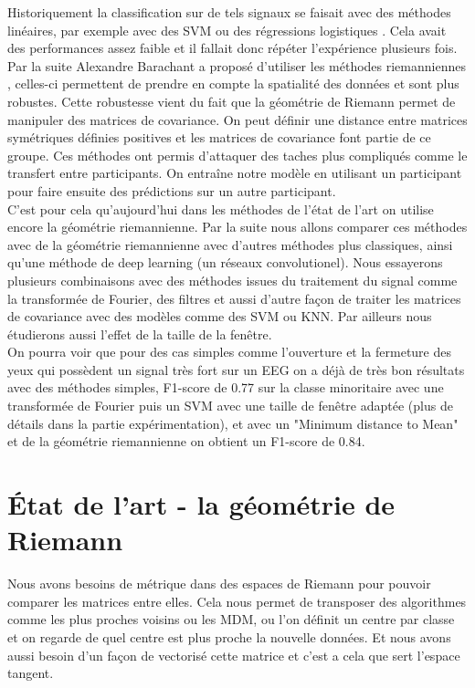 \documentclass{article}[12pt]
\begin{document}
Historiquement la classification sur de tels signaux se faisait avec des méthodes linéaires, par exemple avec des SVM ou des régressions logistiques \cite{garcia_support_2003}. Cela avait des performances assez faible et il fallait donc répéter l’expérience plusieurs fois. Par la suite Alexandre Barachant a proposé d'utiliser les méthodes riemanniennes \cite{congedo_riemannian_2017}, celles-ci permettent de prendre en compte la spatialité des données et sont plus robustes. Cette robustesse vient du fait que la géométrie de Riemann permet de manipuler des matrices de covariance. On peut définir une distance entre matrices symétriques définies positives et les matrices de covariance font partie de ce groupe. Ces méthodes ont permis d'attaquer des taches plus compliqués comme le transfert entre participants. On entraîne notre modèle en utilisant un participant pour faire ensuite des prédictions sur un autre participant.\\

C'est pour cela qu'aujourd'hui dans les méthodes de l’état de l'art on utilise encore la géométrie riemannienne. Par la suite nous allons comparer ces méthodes avec de la géométrie riemannienne avec d'autres méthodes plus classiques, ainsi qu'une méthode de deep learning (un réseaux convolutionel). Nous essayerons plusieurs combinaisons avec des méthodes issues du traitement du signal comme la transformée de Fourier, des filtres et aussi d'autre façon de traiter les matrices de covariance avec des modèles comme des SVM ou KNN. Par ailleurs nous étudierons aussi l'effet de la taille de la fenêtre.\\

On pourra voir que pour des cas simples comme l'ouverture et la fermeture des yeux qui possèdent un signal très fort sur un EEG on a déjà de très bon résultats avec des méthodes simples, F1-score de 0.77 sur la classe minoritaire avec une transformée de Fourier puis un SVM avec une taille de fenêtre adaptée (plus de détails dans la partie expérimentation), et avec un "Minimum distance to Mean" et de la géométrie riemannienne on obtient un F1-score de 0.84.\\

\part{État de l'art - la géométrie de Riemann}
Nous avons besoins de métrique dans des espaces de Riemann pour pouvoir comparer les matrices entre elles. Cela nous permet de transposer des algorithmes comme les plus proches voisins ou les MDM, ou l'on définit un centre par classe et on regarde de quel centre est plus proche la nouvelle données. Et nous avons aussi besoin d'un façon de vectorisé cette matrice et c'est a cela que sert l'espace tangent.
\end{document}

